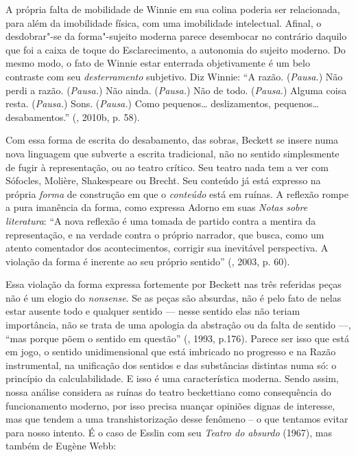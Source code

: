 A própria falta de mobilidade de Winnie em sua colina poderia ser
relacionada, para além da imobilidade física, com uma imobilidade
intelectual. Afinal, o desdobrar"-se da forma"-sujeito moderna parece
desembocar no contrário daquilo que foi a caixa de toque do
Esclarecimento, a autonomia do sujeito moderno. Do mesmo modo, o fato de
Winnie estar enterrada objetivamente é um belo contraste com seu
\emph{desterramento} subjetivo. Diz Winnie: ``A razão. (\emph{Pausa.})
Não perdi a razão. (\emph{Pausa.}) Não ainda. (\emph{Pausa.}) Não de
todo. (\emph{Pausa.}) Alguma coisa resta. (\emph{Pausa.}) Sons.
(\emph{Pausa.}) Como pequenos\ldots{} deslizamentos, pequenos\ldots{}
desabamentos.'' (, 2010b, p. 58).

Com essa forma de escrita do desabamento, das sobras, Beckett se insere
numa nova linguagem que subverte a escrita tradicional, não no sentido
simplesmente de fugir à representação, ou ao teatro crítico. Seu teatro
nada tem a ver com Sófocles, Molière, Shakespeare ou Brecht. Seu
conteúdo já está expresso na própria \emph{forma} de construção em que o
\emph{conteúdo} está em ruínas. A reflexão rompe a pura imanência da
forma, como expressa Adorno em suas \emph{Notas sobre literatura}: ``A
nova reflexão é uma tomada de partido contra a mentira da representação,
e na verdade contra o próprio narrador, que busca, como um atento
comentador dos acontecimentos, corrigir sua inevitável perspectiva. A
violação da forma é inerente ao seu próprio sentido'' (, 2003, p.
60).

Essa violação da forma expressa fortemente por Beckett nas três
referidas peças não é um elogio do \emph{nonsense}. Se as peças são
absurdas, não é pelo fato de nelas estar ausente todo e qualquer sentido
--- nesse sentido elas não teriam importância, não se trata de uma
apologia da abstração ou da falta de sentido ---, ``mas porque põem o
sentido em questão'' (, 1993, p.176). Parece ser isso que está em
jogo, o sentido unidimensional que está imbricado no progresso e na
Razão instrumental, na unificação dos sentidos e das substâncias
distintas numa só: o princípio da calculabilidade. E isso é uma
característica moderna. Sendo assim, nossa análise considera as ruínas
do teatro beckettiano como consequência do funcionamento moderno, por
isso precisa nuançar opiniões dignas de interesse, mas que tendem a uma
transhistorização desse fenômeno -- o que tentamos evitar para nosso
intento. É o caso de Esslin com seu \emph{Teatro do absurdo} (1967), mas
também de Eugène Webb:

